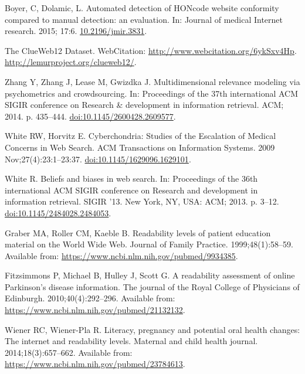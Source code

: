 \documentclass[10pt,a4paper]{article}
\begin{document}
\begin{thebibliography}{10}

    Boyer, C, Dolamic, L.
    \newblock Automated detection of HONcode website conformity compared to manual 
    detection: an evaluation.
    \newblock In: Journal of medical Internet research. 2015; 17:6.
    \newblock \href {http://doi.org/10.2196/jmir.3831}
    {10.2196/jmir.3831}.

	The ClueWeb12 Dataset.
	 WebCitation:
	\url{http://www.webcitation.org/6ykSxv4Hp}.
	\newblock \url{http://lemurproject.org/clueweb12/}.
	
	Zhang Y, Zhang J, Lease M, Gwizdka J.
	\newblock Multidimensional relevance modeling via psychometrics and
	crowdsourcing.
	\newblock In: Proceedings of the 37th international ACM SIGIR conference on
	Research \& development in information retrieval. ACM; 2014. p. 435--444.
	\newblock \href {http://dx.doi.org/10.1145/2600428.2609577}
	{doi:10.1145/2600428.2609577}.
	
	White RW, Horvitz E.
	\newblock Cyberchondria: Studies of the Escalation of Medical Concerns in Web
	Search.
	\newblock ACM Transactions on Information Systems. 2009 Nov;27(4):23:1--23:37.
	\newblock \href {http://dx.doi.org/10.1145/1629096.1629101}
	{doi:10.1145/1629096.1629101}.
	
	White R.
	\newblock Beliefs and biases in web search.
	\newblock In: Proceedings of the 36th international ACM SIGIR conference on
	Research and development in information retrieval. SIGIR '13. New York, NY,
	USA: ACM; 2013. p. 3--12.
	\newblock \href {http://dx.doi.org/10.1145/2484028.2484053}
	{doi:10.1145/2484028.2484053}.
	
	Graber MA, Roller CM, Kaeble B.
	\newblock Readability levels of patient education material on the World Wide
	Web.
	\newblock Journal of Family Practice. 1999;48(1):58--59.
	\newblock Available from: \url{https://www.ncbi.nlm.nih.gov/pubmed/9934385}.
	
	Fitzsimmons P, Michael B, Hulley J, Scott G.
	\newblock A readability assessment of online Parkinson's disease information.
	\newblock The journal of the Royal College of Physicians of Edinburgh.
	2010;40(4):292--296.
	\newblock Available from: \url{https://www.ncbi.nlm.nih.gov/pubmed/21132132}.
	
	Wiener RC, Wiener-Pla R.
	\newblock Literacy, pregnancy and potential oral health changes: The internet
	and readability levels.
	\newblock Maternal and child health journal. 2014;18(3):657--662.
	\newblock Available from: \url{https://www.ncbi.nlm.nih.gov/pubmed/23784613}.
	

\end{thebibliography}
\end{document}
